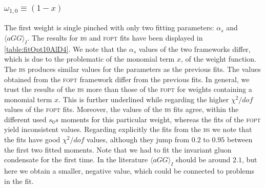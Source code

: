 \documentclass[../../index.tex]{subfiles}
\begin{document}
\subsubsection{\(\omega_{1,0} \equiv (1-x)\)}
The first weight is single pinched with only two fitting parameters:
\(\alpha_s\) and \(\langle aGG \rangle_I\). The results for \textsc{bs} and
\textsc{fopt} fits have been displayed in \cref{table:fitOpt10AlD4}. We note
that the \(\alpha_s\) values of the two frameworks differ, which is due to the
problematic of the monomial term \(x\), of the weight function. The \textsc{bs}
produces similar values for the parameters as the previous fits. The values
obtained from the \textsc{fopt} framework differ from the previous fits. In
general, we trust the results of the \textsc{bs} more than those of the
\textsc{fopt} for weights containing a monomial term \(x\). This is further
underlined while regarding the higher \(\chi^2/dof\) values of the \textsc{fopt}
fits. Moreover, the values of the \textsc{bs} fits agree, within the different
used \(s_0s\) moments for this particular weight, whereas the fits of the
\textsc{fopt} yield inconsistent values. Regarding explicitly the fits from the
\textsc{bs} we note that the fits have good \(\chi^2/dof\) values, although they
jump from \(0.2\) to \(0.95\) between the first two fitted moments. Note that we
had to fit the invariant gluon condensate for the first time. In the literature
\(\langle aGG \rangle_I\) should be around \(2.1\), but here we obtain a
smaller, negative value, which could be connected to problems in the fit.
\end{document}

